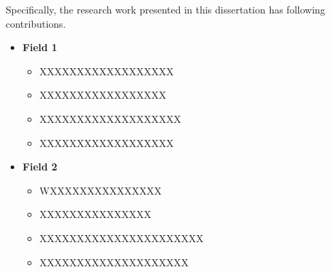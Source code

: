 

Specifically, the research work presented in this dissertation has following contributions.
\begin{itemize}
	\item \textbf{Field 1}
	\begin{itemize}
		\item XXXXXXXXXXXXXXXXXX
		\item XXXXXXXXXXXXXXXXX
		\item XXXXXXXXXXXXXXXXXXX 
		\item XXXXXXXXXXXXXXXXXX
	\end{itemize}
	\item \textbf{Field 2}
	\begin{itemize}
		\item WXXXXXXXXXXXXXXX
		\item XXXXXXXXXXXXXXX
		\item XXXXXXXXXXXXXXXXXXXXXX
		\item XXXXXXXXXXXXXXXXXXXX
	\end{itemize}
\end{itemize}

